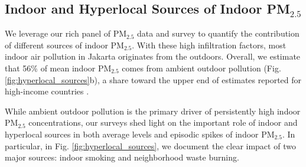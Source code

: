 \documentclass[9pt,twocolumn,twoside]{pnas-new}
\begin{document}
\subsection{Indoor and Hyperlocal Sources of Indoor PM$_{2.5}$}

We leverage our rich panel of PM$_{2.5}$ data and survey to quantify the contribution of different sources of indoor PM$_{2.5}$. With these high infiltration factors, most indoor air pollution in Jakarta originates from the outdoors. Overall, we estimate that 56\% of mean indoor PM$_{2.5}$ comes from ambient outdoor pollution (Fig. \ref{fig:hyperlocal_sources}b), a share toward the upper end of estimates reported for high-income countries \citep{lunderberg_assessing_2023}.

While ambient outdoor pollution is the primary driver of persistently high indoor PM$_{2.5}$ concentrations, our surveys shed light on the important role of indoor and hyperlocal sources in both average levels and episodic spikes of indoor PM$_{2.5}$. In particular, in Fig. \ref{fig:hyperlocal_sources}, we document the clear impact of two major sources: indoor smoking and neighborhood waste burning.
\end{document}
